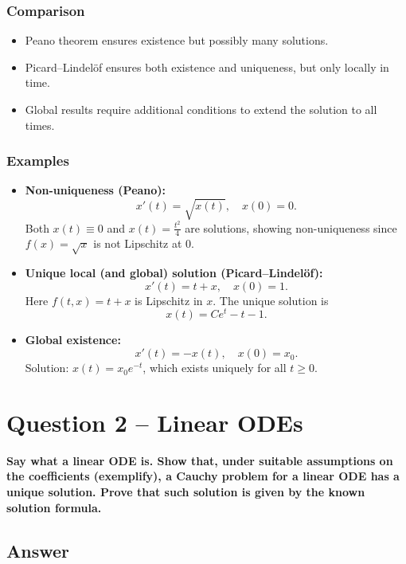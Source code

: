 \documentclass[12pt,a4paper]{book}
\theoremstyle{remark}
\begin{document}
\subsubsection*{Comparison}
\begin{itemize}
    \item Peano theorem ensures existence but possibly many solutions.
    \item Picard–Lindelöf ensures both existence and uniqueness, but only locally in time.
    \item Global results require additional conditions to extend the solution to all times.
\end{itemize}

\subsubsection*{Examples}
\begin{itemize}
    \item \textbf{Non-uniqueness (Peano):} 
    \[
    x'(t) = \sqrt{x(t)}, \quad x(0)=0.
    \] 
    Both $x(t)\equiv 0$ and $x(t) = \tfrac{t^2}{4}$ are solutions, showing non-uniqueness since $f(x)=\sqrt{x}$ is not Lipschitz at $0$.

    \item \textbf{Unique local (and global) solution (Picard–Lindelöf):} 
    \[
    x'(t) = t+x, \quad x(0)=1.
    \]
    Here $f(t,x)=t+x$ is Lipschitz in $x$. The unique solution is
    \[
    x(t) = Ce^t - t - 1.
    \]

    \item \textbf{Global existence:} 
    \[
    x'(t) = -x(t), \quad x(0)=x_0.
    \]
    Solution: $x(t)=x_0e^{-t}$, which exists uniquely for all $t\geq 0$.
\end{itemize}













\newpage
\section{Question 2 -- Linear ODEs}
\textbf{Say what a linear ODE is. Show that, under suitable assumptions on the coefficients (exemplify), a Cauchy problem for a linear ODE has a unique solution. Prove that such solution is given by the known solution formula.}

\subsection*{Answer}
\end{document}
